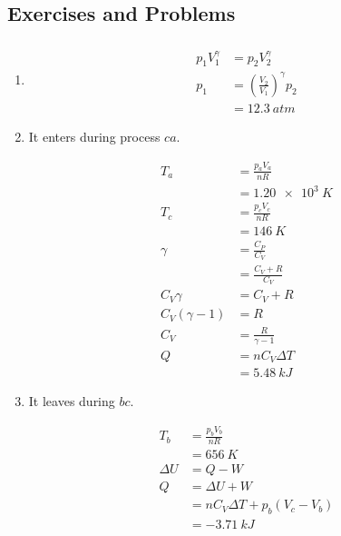 \documentclass{article}
\begin{document}
\subsection{Exercises and Problems}

\setcounter{subsubsection}{4}
\subsubsection{}

\begin{enumerate}
  \item

        \begin{align*}
          p_1 V_1^\gamma & = p_2 V_2^\gamma                            \\
          p_1            & = \left( \frac{V_2}{V_1} \right)^\gamma p_2 \\
                         & = \qty{12.3}{atm}
        \end{align*}

  \item It enters during process $c a$.

        \begin{align*}
          T_a              & = \frac{p_a V_a}{n R}  \\
                           & = \qty{1.20e3}{K}      \\
          T_c              & = \frac{p_c V_c}{n R}  \\
                           & = \qty{146}{K}         \\
          \gamma           & = \frac{C_P}{C_V}      \\
                           & = \frac{C_V + R}{C_V}  \\
          C_V \gamma       & = C_V + R              \\
          C_V (\gamma - 1) & = R                    \\
          C_V              & = \frac{R}{\gamma - 1} \\
          Q                & = n C_V \Delta T       \\
                           & = \qty{5.48}{kJ}
        \end{align*}

  \item It leaves during $b c$.

        \begin{align*}
          T_b      & = \frac{p_b V_b}{n R}              \\
                   & = \qty{656}{K}                     \\
          \Delta U & = Q - W                            \\
          Q        & = \Delta U + W                     \\
                   & = n C_V \Delta T + p_b (V_c - V_b) \\
                   & = \qty{-3.71}{kJ}
        \end{align*}


\end{enumerate}
\end{document}
